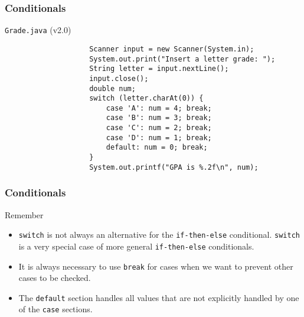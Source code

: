 \documentclass[10pt, compress]{beamer}
\begin{document}
\begin{frame}[fragile]
	\frametitle{Conditionals}
	\begin{block}{\texttt{Grade.java} (v2.0)}
		\begin{verbatim}
			        Scanner input = new Scanner(System.in);
			        System.out.print("Insert a letter grade: ");
			        String letter = input.nextLine();
			        input.close();
			        double num;
			        switch (letter.charAt(0)) {
			            case 'A': num = 4; break;
			            case 'B': num = 3; break;
			            case 'C': num = 2; break;
			            case 'D': num = 1; break;
			            default: num = 0; break;
			        }
			        System.out.printf("GPA is %.2f\n", num);
		\end{verbatim}
	\end{block}
\end{frame}

\begin{frame}[fragile]
	\frametitle{Conditionals}
	\begin{block}{Remember}
		\begin{itemize}
			\item[] \texttt{switch} is not always an alternative for the \texttt{if-then-else} conditional. \texttt{switch} is a very special case of more general \texttt{if-then-else} conditionals.
			\item[] It is always necessary to use \texttt{break} for cases when we want to prevent other cases to be checked.
			\item[] The \texttt{default} section handles all values that are not explicitly handled by one of the \texttt{case} sections.
		\end{itemize}
	\end{block}
\end{frame}

\end{document}
